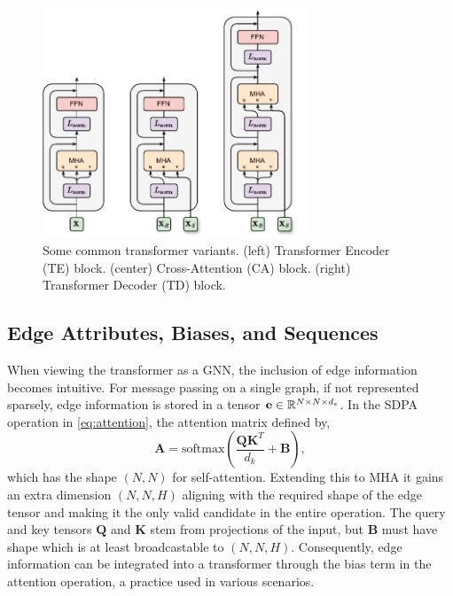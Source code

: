 \begin{figure}
    \centering
    \includegraphics[width=0.7\textwidth]{Figures/transformers/transformer_variants.pdf}
    \caption{Some common transformer variants. (left) Transformer Encoder (TE) block. (center) Cross-Attention (CA) block. (right) Transformer Decoder (TD) block.}
    \label{fig:transformer_blocks}
\end{figure}

\subsection{Edge Attributes, Biases, and Sequences}
\label{sec:edge_biases_sequences}

When viewing the transformer as a GNN, the inclusion of edge information becomes intuitive.
For message passing on a single graph, if not represented sparsely, edge information is stored in a tensor $\mathbf{e} \in \mathbb{R}^{N \times N \times d_e}$.
In the SDPA operation in \cref{eq:attention}, the attention matrix defined by,
\begin{equation}
    \mathbf{A} = \text{softmax}\left( \frac{\mathbf{Q} \mathbf{K}^T}{d_k} + \mathbf{B} \right),
\end{equation}
which has the shape $(N, N)$ for self-attention.
Extending this to MHA it gains an extra dimension $(N, N, H)$ aligning with the required shape of the edge tensor and making it the only valid candidate in the entire operation.
The query and key tensors $\mathbf{Q}$ and $\mathbf{K}$ stem from projections of the input, but $\mathbf{B}$ must have shape which is at least broadcastable to $(N, N, H)$.
Consequently, edge information can be integrated into a transformer through the bias term in the attention operation, a practice used in various scenarios.

